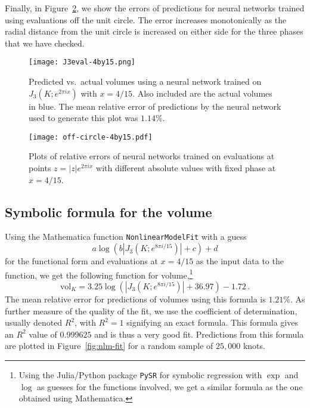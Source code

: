 \documentclass[11pt]{article}
\begin{document}
Finally, in Figure~\ref{fig:off-circle}, we show the errors of predictions for neural networks trained using evaluations off the unit circle.
The error increases monotonically as the radial distance from the unit circle is increased on either side for the three phases that we have checked.

\begin{figure}[h] 
  \begin{center}
    \texttt{[image: J3eval-4by15.png]}
  \end{center}
  \caption{\textsf{Predicted vs.\ actual volumes using a neural network trained on $J_3(K;e^{2\pi ix})$ with $x=4/15$. Also included are the actual volumes in blue. The mean relative error of predictions by the neural network used to generate this plot was $1.14\%$.}}  \label{fig:J3-evals-4by15}
\end{figure}
\begin{figure}[h] 
	\begin{center}
    \texttt{[image: off-circle-4by15.pdf]}
    \end{center}
  \caption{\textsf{Plots of relative errors of neural networks trained on evaluations at points $z=|z|e^{2\pi ix}$ with different absolute values with fixed phase at $x=4/15$.}}  \label{fig:off-circle}
\end{figure}





\subsection{Symbolic formula for the volume}

Using the Mathematica function \texttt{NonlinearModelFit} with a guess
\begin{equation}
    a \log(b|J_3(K;e^{8\pi i/15})|+c)+d
\end{equation}
for the functional form and evaluations at $x=4/15$ as the input data to the function, we get the following function for volume,\footnote{
Using the Julia/Python package \texttt{PySR} for symbolic regression with $\exp$ and $\log$ as guesses for the functions involved, we get a similar formula as the one obtained using Mathematica.}
\begin{equation}			\label{eq-regression-result}
	\text{vol}_K = 3.25\log(|J_3(K;e^{8\pi i/15})|+36.97) - 1.72 \,.
\end{equation}
The mean relative error for predictions of volumes using this formula is $1.21\%$. As further measure of the quality of the fit, we use the coefficient of determination, usually denoted $R^2$, with $R^2=1$ signifying an exact formula.
This formula gives an $R^2$ value of $0.999625$ and is thus a very good fit.
Predictions from this formula are plotted in Figure~\ref{fig:nlm-fit} for a random sample of $25{,} 000$ knots.
\end{document}
